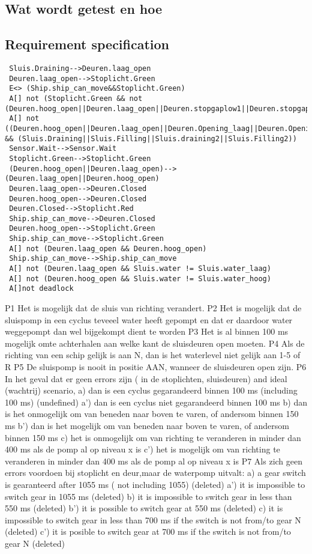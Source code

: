  \subsection{Wat wordt getest en hoe}
 
 
 \subsection{Requirement specification}
  \begin{verbatim}
 Sluis.Draining-->Deuren.laag_open
 Deuren.laag_open-->Stoplicht.Green
 E<> (Ship.ship_can_move&&Stoplicht.Green)
 A[] not (Stoplicht.Green && not (Deuren.hoog_open||Deuren.laag_open||Deuren.stopgaplow1||Deuren.stopgaplow2||Deuren.stopgaphigh1||Deuren.stopgaphigh2))
 A[] not ((Deuren.hoog_open||Deuren.laag_open||Deuren.Opening_laag||Deuren.Opening_hoog||Deuren.Closing_hoog||Deuren.Closing_laag) && (Sluis.Draining||Sluis.Filling||Sluis.draining2||Sluis.Filling2))
 Sensor.Wait-->Sensor.Wait
 Stoplicht.Green-->Stoplicht.Green
 (Deuren.hoog_open||Deuren.laag_open)-->(Deuren.laag_open||Deuren.hoog_open)
 Deuren.laag_open-->Deuren.Closed
 Deuren.hoog_open-->Deuren.Closed
 Deuren.Closed-->Stoplicht.Red
 Ship.ship_can_move-->Deuren.Closed
 Deuren.hoog_open-->Stoplicht.Green
 Ship.ship_can_move-->Stoplicht.Green
 A[] not (Deuren.laag_open && Deuren.hoog_open)
 Ship.ship_can_move-->Ship.ship_can_move
 A[] not (Deuren.laag_open && Sluis.water != Sluis.water_laag)
 A[] not (Deuren.hoog_open && Sluis.water != Sluis.water_hoog)
 A[]not deadlock
  \end{verbatim}
 P1 Het is mogelijk dat de sluis van richting verandert.
 P2 Het is mogelijk dat de sluispomp in een cyclus teveeel water heeft gepompt en dat er daardoor water weggepompt dan wel bijgekompt dient te worden
 P3 Het is al binnen 100 ms mogelijk omte achterhalen aan welke kant de sluisdeuren  open moeten.
 P4 Als de richting van een schip gelijk is aan N, dan is het waterlevel niet gelijk aan 1-5 of R
 P5 De sluispomp is nooit in positie AAN, wanneer de sluisdeuren open zijn.
 P6 In het geval dat er geen errors zijn (  in de stoplichten, sluisdeuren) and ideal (wachtrij) scenario,
 a) dan is een cyclus gegarandeerd binnen 100 ms (including 100 ms) (undefined)
 a') dan is een cyclus niet gegarandeerd binnen 100 ms
 b)  dan is het onmogelijk om van beneden naar boven te varen, of andersom binnen 150 ms
 b') dan is het mogelijk om van beneden naar boven te varen, of andersom binnen 150 ms
 c) het is onmogelijk om van richting te veranderen in minder dan 400 ms als de pomp al op niveau x is
 c') het is mogelijk om van richting te veranderen in minder dan 400 ms als de pomp al op niveau x is
 P7 Als zich geen errors voordoen bij stoplicht en deur,maar de waterpomp uitvalt:
 a)  a gear switch is gearanteerd after 1055 ms ( not including  1055)  (deleted)
 a') it is impossible  to switch gear in 1055 ms     (deleted)
 b) it is  impossible to switch gear in less than 550 ms (deleted)
 b') it is possible to switch gear at 550 ms (deleted)
 c) it is impossible to switch  gear in  less than 700 ms if the switch is not from/to gear N (deleted)
 c') it is posible to switch gear at 700 ms if the switch is not from/to gear N (deleted)
 
